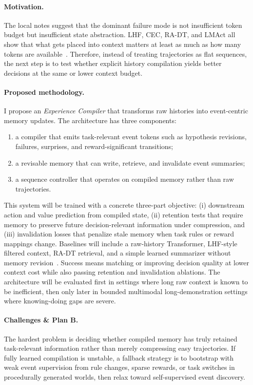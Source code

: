 \documentclass[10pt,twocolumn,letterpaper]{article}
\begin{document}
\paragraph{Motivation.}
The local notes suggest that the dominant failure mode is not insufficient token budget but insufficient state abstraction. LHF, CEC, RA-DT, and LMAct all show that what gets placed into context matters at least as much as how many tokens are available~\cite{chen2025lhf,shi2023cec,schmied2024radt,ruoss2024lmact}. Therefore, instead of treating trajectories as flat sequences, the next step is to test whether explicit history compilation yields better decisions at the same or lower context budget.

\paragraph{Proposed methodology.}
I propose an \emph{Experience Compiler} that transforms raw histories into event-centric memory updates. The architecture has three components:
\begin{enumerate}[leftmargin=1.3em]
\item a compiler that emits task-relevant event tokens such as hypothesis revisions, failures, surprises, and reward-significant transitions;
\item a revisable memory that can write, retrieve, and invalidate event summaries;
\item a sequence controller that operates on compiled memory rather than raw trajectories.
\end{enumerate}
This system will be trained with a concrete three-part objective: (i) downstream action and value prediction from compiled state, (ii) retention tests that require memory to preserve future decision-relevant information under compression, and (iii) invalidation losses that penalize stale memory when task rules or reward mappings change. Baselines will include a raw-history Transformer, LHF-style filtered context, RA-DT retrieval, and a simple learned summarizer without memory revision~\cite{chen2025lhf,schmied2024radt}. Success means matching or improving decision quality at lower context cost while also passing retention and invalidation ablations. The architecture will be evaluated first in settings where long raw context is known to be inefficient, then only later in bounded multimodal long-demonstration settings where knowing-doing gaps are severe.

\paragraph{Challenges \& Plan B.}
The hardest problem is deciding whether compiled memory has truly retained task-relevant information rather than merely compressing easy trajectories. If fully learned compilation is unstable, a fallback strategy is to bootstrap with weak event supervision from rule changes, sparse rewards, or task switches in procedurally generated worlds, then relax toward self-supervised event discovery.
\end{document}

